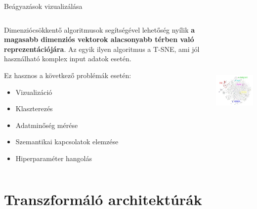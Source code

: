 \documentclass[english, aspectratio=169]{beamer}
\makeatletter
\let\origtableofcontents=\tableofcontents
\def\tableofcontents{\@ifnextchar[{\origtableofcontents}{\gobbletableofcontents}}
\def\gobbletableofcontents#1{\origtableofcontents}
\makeatother
\begin{document}
\begin{frame}{Beágyazások vizualizálása}
\begin{columns}
\begin{column}{.5\textwidth}
Dimenziócsökkentő algoritmusok segítségével lehetőség nyílik \textbf{a magasabb dimenziós vektorok alacsonyabb térben való reprezentációjára}. Az egyik ilyen algoritmus a T-SNE, ami jól használható komplex input adatok esetén.\par\smallskip
Ez hasznos a következő problémák esetén:
\begin{itemize}
	\item Vizualizáció
	\item Klaszterezés
	\item Adatminőség mérése
	\item Szemantikai kapcsolatok elemzése
	\item Hiperparaméter hangolás
\end{itemize}
\end{column}
\begin{column}{.5\textwidth}
\begin{center}
\includegraphics[width=7cm, height=7cm, keepaspectratio]{images/transformer_1.png}
\end{center}
\end{column}
\end{columns}
\end{frame}

\section{Transzformáló architektúrák}

\begin{frame}{}
\tableofcontents[currentsection]
\end{frame}
\end{document}
